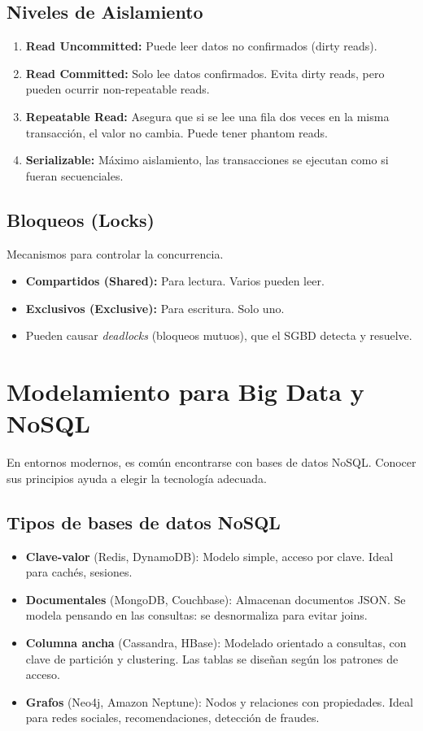 \documentclass[12pt,a4paper,openany,oneside]{book}
\begin{document}
\section{Niveles de Aislamiento}
\begin{enumerate}
    \item \textbf{Read Uncommitted:} Puede leer datos no confirmados (dirty reads).
    \item \textbf{Read Committed:} Solo lee datos confirmados. Evita dirty reads, pero pueden ocurrir non-repeatable reads.
    \item \textbf{Repeatable Read:} Asegura que si se lee una fila dos veces en la misma transacción, el valor no cambia. Puede tener phantom reads.
    \item \textbf{Serializable:} Máximo aislamiento, las transacciones se ejecutan como si fueran secuenciales.
\end{enumerate}

\section{Bloqueos (Locks)}
Mecanismos para controlar la concurrencia.
\begin{itemize}
    \item \textbf{Compartidos (Shared):} Para lectura. Varios pueden leer.
    \item \textbf{Exclusivos (Exclusive):} Para escritura. Solo uno.
    \item Pueden causar \textit{deadlocks} (bloqueos mutuos), que el SGBD detecta y resuelve.
\end{itemize}

\chapter{Modelamiento para Big Data y NoSQL}
En entornos modernos, es común encontrarse con bases de datos NoSQL. Conocer sus principios ayuda a elegir la tecnología adecuada.

\section{Tipos de bases de datos NoSQL}
\begin{itemize}
    \item \textbf{Clave-valor} (Redis, DynamoDB): Modelo simple, acceso por clave. Ideal para cachés, sesiones.
    \item \textbf{Documentales} (MongoDB, Couchbase): Almacenan documentos JSON. Se modela pensando en las consultas: se desnormaliza para evitar joins.
    \item \textbf{Columna ancha} (Cassandra, HBase): Modelado orientado a consultas, con clave de partición y clustering. Las tablas se diseñan según los patrones de acceso.
    \item \textbf{Grafos} (Neo4j, Amazon Neptune): Nodos y relaciones con propiedades. Ideal para redes sociales, recomendaciones, detección de fraudes.
\end{itemize}
\end{document}
